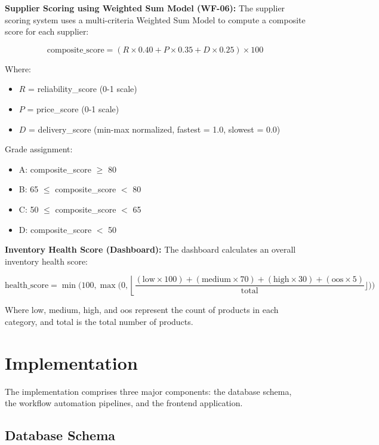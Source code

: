 \documentclass[journal]{IEEEtran}
\begin{document}
\textbf{Supplier Scoring using Weighted Sum Model (WF-06):}
The supplier scoring system uses a multi-criteria Weighted Sum Model to compute a composite score for each supplier:

\begin{equation}
\text{composite\_score} = (R \times 0.40 + P \times 0.35 + D \times 0.25) \times 100
\end{equation}

Where:
\begin{itemize}
\item $R$ = reliability\_score (0-1 scale)
\item $P$ = price\_score (0-1 scale)  
\item $D$ = delivery\_score (min-max normalized, fastest = 1.0, slowest = 0.0)
\end{itemize}

Grade assignment:
\begin{itemize}
\item A: composite\_score $\geq$ 80
\item B: 65 $\leq$ composite\_score $<$ 80
\item C: 50 $\leq$ composite\_score $<$ 65
\item D: composite\_score $<$ 50
\end{itemize}

\textbf{Inventory Health Score (Dashboard):}
The dashboard calculates an overall inventory health score:

\begin{equation}
\text{health\_score} = \min(100, \max(0, \left\lfloor \frac{(\text{low} \times 100) + (\text{medium} \times 70) + (\text{high} \times 30) + (\text{oos} \times 5)}{\text{total}} \rfloor))
\end{equation}

Where low, medium, high, and oos represent the count of products in each category, and total is the total number of products.

\section{Implementation}

The implementation comprises three major components: the database schema, the workflow automation pipelines, and the frontend application.

\subsection{Database Schema}
\end{document}

